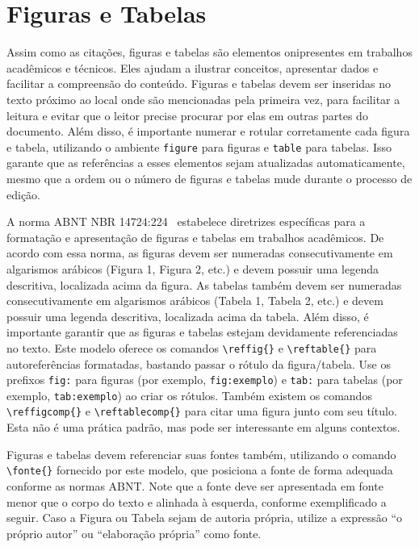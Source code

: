 \section{Figuras e Tabelas}\label{sec:figuras-tabelas}

Assim como as citações, figuras e tabelas são elementos onipresentes em trabalhos acadêmicos e
técnicos. Eles ajudam a ilustrar conceitos, apresentar dados e facilitar a compreensão do conteúdo.
Figuras e tabelas devem ser inseridas no texto próximo ao local onde são mencionadas pela primeira
vez, para facilitar a leitura e evitar que o leitor precise procurar por elas em outras partes do
documento. Além disso, é importante numerar e rotular corretamente cada figura e tabela, utilizando
o ambiente \texttt{figure} para figuras e \texttt{table} para tabelas. Isso garante que as referências
a esses elementos sejam atualizadas automaticamente, mesmo que a ordem ou o número de figuras e
tabelas mude durante o processo de edição.

A norma ABNT NBR 14724:224~\cite{nbr14724:2024} estabelece diretrizes específicas para a
formatação e apresentação de figuras e tabelas em trabalhos acadêmicos. De acordo com essa norma,
as figuras devem ser numeradas consecutivamente em algarismos arábicos (Figura 1, Figura 2, etc.) e
devem possuir uma legenda descritiva, localizada acima da figura. As tabelas também devem ser
numeradas consecutivamente em algarismos arábicos (Tabela 1, Tabela 2, etc.) e devem possuir uma
legenda descritiva, localizada acima da tabela. Além disso, é importante garantir que as figuras e
tabelas estejam devidamente referenciadas no texto. Este modelo oferece os comandos
\verb|\reffig{}| e \verb|\reftable{}| para autoreferências formatadas, bastando passar o rótulo da figura/tabela. Use os prefixos \texttt{fig:} para figuras (por exemplo, \texttt{fig:exemplo})
e \texttt{tab:} para tabelas (por exemplo, \texttt{tab:exemplo}) ao criar os rótulos. Também existem
os comandos \verb|\reffigcomp{}| e \verb|\reftablecomp{}| para citar uma figura junto com seu título. Esta não é uma prática padrão, mas pode ser interessante em alguns contextos.

Figuras e tabelas devem referenciar suas fontes também, utilizando o comando \verb|\fonte{}|
fornecido por este modelo, que posiciona a fonte de forma adequada conforme as normas ABNT.  Note
que a fonte deve ser apresentada em fonte menor que o corpo do texto e alinhada à esquerda, conforme
exemplificado a seguir. Caso a Figura ou Tabela sejam de autoria própria, utilize a expressão ``o
próprio autor'' ou ``elaboração própria'' como fonte.

